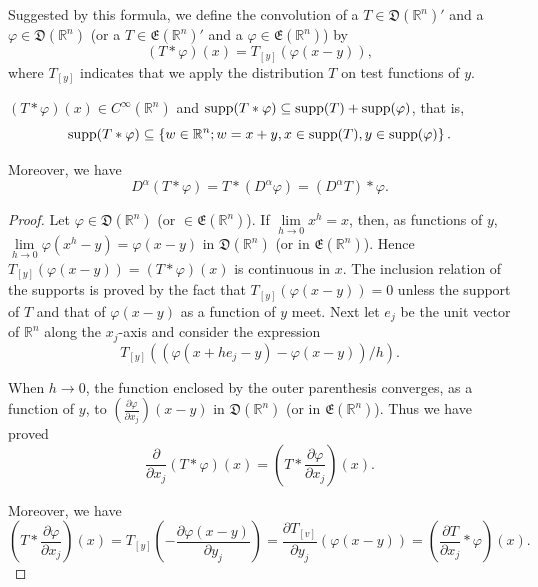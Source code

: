 Suggested by this formula, we define the convolution of a $T \in \mathfrak{D}(\mathbb{R}^{n})'$ and a $\varphi \in \mathfrak{D}(\mathbb{R}^{n})$ (or a $T \in \mathfrak{E}(\mathbb{R}^{n})'$ and a $\varphi \in \mathfrak{E}(\mathbb{R}^{n})$) by 
\begin{equation}\label{eq:VI.3.2}
(T * \varphi) (x) = T _{[y]} (\varphi (x - y)),
\end{equation}
where $T_{[y]}$ indicates that we apply the distribution $T$ on test functions of $y$. 

\begin{proposition}\label{prop:VI.3.Proposition.1} $(T * \varphi)(x) \in C^{\infty}(\mathbb{R}^{n})$ and $\operatorname{supp}(T * \varphi) \subseteq \operatorname{supp}(T) + \operatorname{supp}(\varphi)$, that is, 
\[
\operatorname{supp} (T * \varphi) \subseteq \left\{w \in \mathbb{R}^{n}; w = x + y, x \in \operatorname{supp} (T), y \in \operatorname{supp} (\varphi) \right\}.
\]
\end{proposition}

Moreover, we have 
\begin{equation}\label{eq:VI.3.3}
D ^{\alpha} (T * \varphi) = T * (D ^{\alpha} \varphi) = (D ^{\alpha} T) * \varphi .
\end{equation}

\begin{proof}
 Let $\varphi \in \mathfrak{D}(\mathbb{R}^{n})$ (or $\in \mathfrak{E}(\mathbb{R}^{n})$). If $\lim\limits_{h\to 0}x^h = x$, then, as functions of $y$, $\lim\limits_{h\to 0}\varphi (x^h -y) = \varphi (x - y)$ in $\mathfrak{D}(\mathbb{R}^{n})$ (or in $\mathfrak{E}(\mathbb{R}^{n})$). Hence $T_{[y]}(\varphi (x - y)) = (T*\varphi)(x)$ is continuous in $x$. The inclusion relation of the supports is proved by the fact that $T_{[y]}(\varphi (x - y)) = 0$ unless the support of $T$ and that of $\varphi (x - y)$ as a function of $y$ meet. Next let $e_j$ be the unit vector of $\mathbb{R}^{n}$ along the $x_j$-axis and consider the expression 
\[
T _{[y]} \left(\left(\varphi (x + h e _{j} - y) - \varphi (x - y)\right) / h\right). \]

When $h \to 0$, the function enclosed by the outer parenthesis converges, as a function of $y$, to $\left(\frac{\partial \varphi}{\partial x_j}\right)(x - y)$ in $\mathfrak{D}(\mathbb{R}^{n})$ (or in $\mathfrak{E}(\mathbb{R}^{n})$). Thus we have proved 
\[
\frac {\partial}{\partial x _{j}} (T * \varphi) (x) = \left(T * \frac {\partial \varphi}{\partial x _{j}}\right) (x).
\]

Moreover, we have 
\[
\left(T * \frac {\partial \varphi}{\partial x _{j}}\right) (x) = T _{[y]} \left(- \frac {\partial \varphi (x - y)}{\partial y _{j}}\right) = \frac {\partial T _{[v]}}{\partial y _{j}} (\varphi (x - y)) = \left(\frac {\partial T}{\partial x _{j}} * \varphi\right) (x).
\]
\end{proof}

